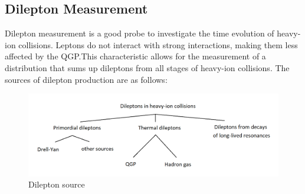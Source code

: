     \subsection{Dilepton Measurement\cite{Geurts:2022xmk}}
        Dilepton measurement is a good probe to investigate the time evolution of heavy-ion collisions. Leptons do not interact with strong interactions, making them less affected by the QGP.\@ This characteristic allows for the measurement of a distribution that sums up dileptons from all stages of heavy-ion collisions. The sources of dilepton production are as follows:   
        
        \begin{figure}[hbtp]
            \centering
            \includegraphics[keepaspectratio, scale=0.3]{fig/1_5_dilepton_source.png}
            \caption{Dilepton source}
            \label{Intro:Dilepton:dilepton_source}
        \end{figure}
        
